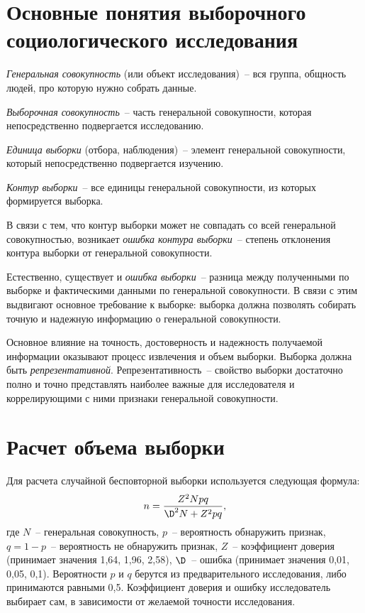   \section{Основные понятия выборочного социологического исследования}

    \emph{Генеральная совокупность} (или объект исследования)~-- вся группа,
    общность людей, про которую нужно собрать данные.

    \emph{Выборочная совокупность}~-- часть генеральной совокупности, которая
    непосредственно подвергается исследованию.

    \emph{Единица выборки} (отбора, наблюдения)~-- элемент генеральной
    совокупности, который непосредственно подвергается изучению.

    \emph{Контур выборки}~-- все единицы генеральной совокупности, из которых
    формируется выборка.

    В связи с тем, что контур выборки может не совпадать со всей генеральной
    совокупностью, возникает \emph{ошибка контура выборки}~-- степень отклонения
    контура выборки от генеральной совокупности.

    Естественно, существует и \emph{ошибка выборки}~-- разница между полученными
    по выборке и фактическими данными по генеральной совокупности. В связи с
    этим выдвигают основное требование к выборке: выборка должна позволять
    собирать точную и надежную информацию о генеральной совокупности.

    Основное влияние на точность, достоверность и надежность получаемой
    информации оказывают процесс извлечения и объем выборки. Выборка должна быть
    \emph{репрезентативной}. Репрезентативность~-- свойство выборки достаточно
    полно и точно представлять наиболее важные для исследователя и
    коррелирующими с ними признаки генеральной совокупности.

  \section{Расчет объема выборки}

    Для расчета случайной бесповторной выборки используется следующая формула:
    \[
      n = \frac{Z^2 Npq}{\D^2 N + Z^2 pq},
    \]
    где \( N \)~-- генеральная совокупность, \( p \)~-- вероятность обнаружить
    признак, \( q = 1 - p \)~-- вероятность не обнаружить признак, \( Z \)~--
    коэффициент доверия (принимает значения 1,64, 1,96, 2,58), \( \D \)~--
    ошибка (принимает значения 0,01, 0,05, 0,1). Вероятности \( p \) и \( q \)
    берутся из предварительного исследования, либо принимаются равными 0,5.
    Коэффициент доверия и ошибку исследователь выбирает сам, в зависимости от
    желаемой точности исследования.

